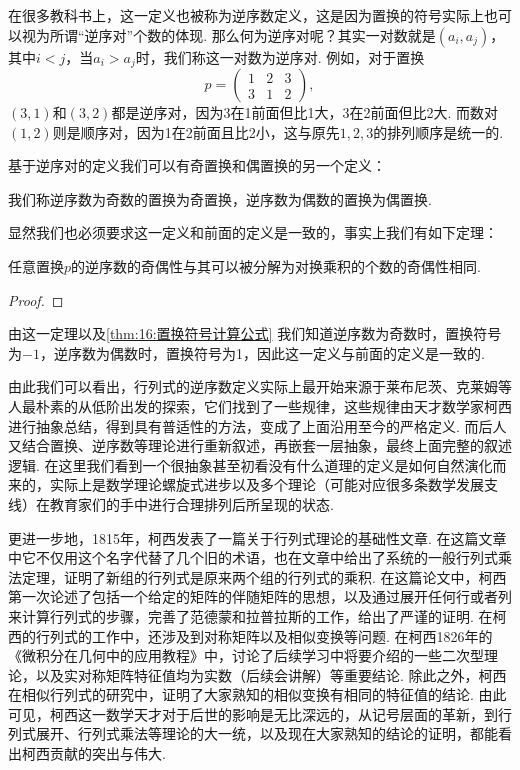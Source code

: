 在很多教科书上，这一定义也被称为逆序数定义，这是因为置换的符号实际上也可以视为所谓``逆序对''个数的体现. 那么何为逆序对呢？其实一对数就是$(a_i,a_j)$，其中$i<j$，当$a_i>a_j$时，我们称这一对数为逆序对. 例如，对于置换
\[p=\begin{pmatrix}
        1 & 2 & 3 \\
        3 & 1 & 2
    \end{pmatrix},\]
$(3,1)$和$(3,2)$都是逆序对，因为3在1前面但比1大，3在2前面但比2大. 而数对$(1,2)$则是顺序对，因为1在2前面且比2小，这与原先$1,2,3$的排列顺序是统一的.

基于逆序对的定义我们可以有奇置换和偶置换的另一个定义：
\begin{definition}
    我们称逆序数为奇数的置换为奇置换，逆序数为偶数的置换为偶置换.
\end{definition}

显然我们也必须要求这一定义和前面的定义是一致的，事实上我们有如下定理：
\begin{theorem}
    任意置换$p$的逆序数的奇偶性与其可以被分解为对换乘积的个数的奇偶性相同.
\end{theorem}

\begin{proof}

\end{proof}

由这一定理以及\autoref{thm:16:置换符号计算公式} 我们知道逆序数为奇数时，置换符号为$-1$，逆序数为偶数时，置换符号为1，因此这一定义与前面的定义是一致的.

由此我们可以看出，行列式的逆序数定义实际上最开始来源于莱布尼茨、克莱姆等人最朴素的从低阶出发的探索，它们找到了一些规律，这些规律由天才数学家柯西进行抽象总结，得到具有普适性的方法，变成了上面沿用至今的严格定义. 而后人又结合置换、逆序数等理论进行重新叙述，再嵌套一层抽象，最终上面完整的叙述逻辑. 在这里我们看到一个很抽象甚至初看没有什么道理的定义是如何自然演化而来的，实际上是数学理论螺旋式进步以及多个理论（可能对应很多条数学发展支线）在教育家们的手中进行合理排列后所呈现的状态.

更进一步地，1815年，柯西发表了一篇关于行列式理论的基础性文章. 在这篇文章中它不仅用这个名字代替了几个旧的术语，也在文章中给出了系统的一般行列式乘法定理，证明了新组的行列式是原来两个组的行列式的乘积. 在这篇论文中，柯西第一次论述了包括一个给定的矩阵的伴随矩阵的思想，以及通过展开任何行或者列来计算行列式的步骤，完善了范德蒙和拉普拉斯的工作，给出了严谨的证明. 在柯西的行列式的工作中，还涉及到对称矩阵以及相似变换等问题. 在柯西1826年的《微积分在几何中的应用教程》中，讨论了后续学习中将要介绍的一些二次型理论，以及实对称矩阵特征值均为实数（后续会讲解）等重要结论. 除此之外，柯西在相似行列式的研究中，证明了大家熟知的相似变换有相同的特征值的结论. 由此可见，柯西这一数学天才对于后世的影响是无比深远的，从记号层面的革新，到行列式展开、行列式乘法等理论的大一统，以及现在大家熟知的结论的证明，都能看出柯西贡献的突出与伟大.

